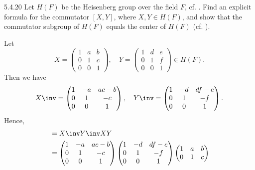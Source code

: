 \begin{exercise}{5.4.20}
    Let $H(F)$ be the Heisenberg group over the field $F$, cf. .
	Find an explicit formula for the commutator $[X, Y]$, where $X, Y \in H(F)$, and show that the commutator subgroup of $H(F)$ equals the center of $H(F)$ (cf. ).
\end{exercise}

\begin{sol}
    Let
    \[
    	X = 
        \begin{pmatrix}
            1 & a & b \\
            0 & 1 & c \\
            0 & 0 & 1
        \end{pmatrix}, \quad
        Y = 
        \begin{pmatrix}
            1 & d & e \\
            0 & 1 & f \\
            0 & 0 & 1
        \end{pmatrix} \in H(F).
	\]
    Then we have
    \[
    	X\inv =
        \begin{pmatrix}
            1 & -a & ac - b \\
            0 & 1 & -c \\
            0 & 0 & 1
        \end{pmatrix}, \quad
        Y\inv =
        \begin{pmatrix}
            1 & -d & df - e \\
            0 & 1 & -f \\
            0 & 0 & 1
        \end{pmatrix}.
	\]
    Hence,
    \begin{align*}
        [X, Y] & = X\inv Y\inv XY \\
        & =
        \begin{pmatrix}
            1 & -a & ac - b \\
            0 & 1 & -c \\
            0 & 0 & 1
        \end{pmatrix}
        \begin{pmatrix}
            1 & -d & df - e \\
            0 & 1 & -f \\
            0 & 0 & 1
        \end{pmatrix}
        \begin{pmatrix}
            1 & a & b \\
            0 & 1 & c \\

\end{pmatrix}
\end{align*}
\end{sol}
